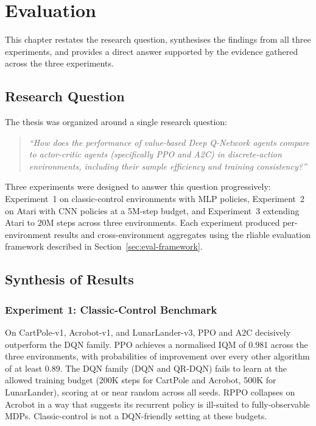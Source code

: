 
\chapter{Evaluation}
\label{chap:evaluation}



{\color{red} This chapter restates the research question, synthesises the findings from all three experiments, and provides a direct answer supported by the evidence gathered across the three experiments.}


\section{Research Question}


The thesis was organized around a single research question:

\begin{quote}
\textit{``How does the performance of value-based Deep Q-Network agents
compare to actor-critic agents (specifically PPO and A2C) in
discrete-action environments, including their sample efficiency and
training consistency?''}
\end{quote}

Three experiments were designed to answer this question progressively:
Experiment~1 on classic-control environments with MLP policies,
Experiment~2 on Atari with CNN policies at a 5M-step budget, and
Experiment~3 extending Atari to 20M steps across three environments.
Each experiment produced per-environment results and cross-environment
aggregates using the rliable evaluation framework described in
Section~\ref{sec:eval-framework}.


\section{Synthesis of Results}

\subsection{Experiment 1: Classic-Control Benchmark}

On CartPole-v1, Acrobot-v1, and LunarLander-v3, PPO and A2C decisively
outperform the DQN family. PPO achieves a normalised IQM of 0.981 across
the three environments, with probabilities of improvement over every
other algorithm of at least 0.89. The DQN family (DQN and QR-DQN) fails
to learn at the allowed training budget (200K steps for CartPole and
Acrobot, 500K for LunarLander), scoring at or near random across all
seeds. RPPO collapses on Acrobot in a way that suggests its recurrent
policy is ill-suited to fully-observable MDPs. Classic-control is not a
DQN-friendly setting at these budgets.

